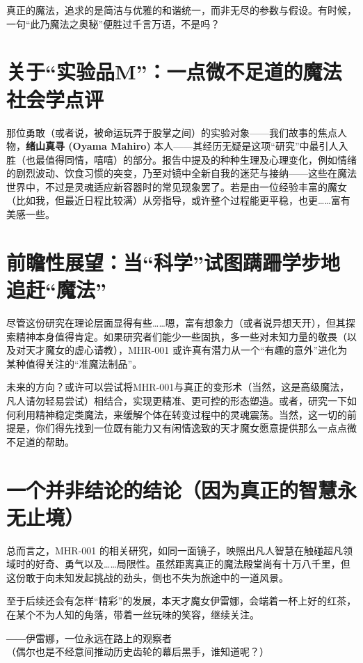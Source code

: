 \documentclass[lang=cn]{elegantpaper}
\begin{document}
真正的魔法，追求的是简洁与优雅的和谐统一，而非无尽的参数与假设。有时候，一句“此乃魔法之奥秘”便胜过千言万语，不是吗？

\section*{关于“实验品M”：一点微不足道的魔法社会学点评}
那位勇敢（或者说，被命运玩弄于股掌之间）的实验对象——我们故事的焦点人物，\textbf{绪山真寻 (Oyama Mahiro)} 本人——其经历无疑是这项“研究”中最引人入胜（也最值得同情，嘻嘻）的部分。报告中提及的种种生理及心理变化，例如情绪的剧烈波动、饮食习惯的突变，乃至对镜中全新自我的迷茫与接纳——这些在魔法世界中，不过是灵魂适应新容器时的常见现象罢了。若是由一位经验丰富的魔女（比如我，但最近日程比较满）从旁指导，或许整个过程能更平稳，也更……富有美感一些。

\section*{前瞻性展望：当“科学”试图蹒跚学步地追赶“魔法”}
尽管这份研究在理论层面显得有些……嗯，富有想象力（或者说异想天开），但其探索精神本身值得肯定。如果研究者们能少一些固执，多一些对未知力量的敬畏（以及对天才魔女的虚心请教），MHR-001 或许真有潜力从一个“有趣的意外”进化为某种值得关注的“准魔法制品”。

未来的方向？或许可以尝试将MHR-001与真正的变形术（当然，这是高级魔法，凡人请勿轻易尝试）相结合，实现更精准、更可控的形态塑造。或者，研究一下如何利用精神稳定类魔法，来缓解个体在转变过程中的灵魂震荡。当然，这一切的前提是，你们得先找到一位既有能力又有闲情逸致的天才魔女愿意提供那么一点点微不足道的帮助。

\section*{一个并非结论的结论（因为真正的智慧永无止境）}
总而言之，MHR-001 的相关研究，如同一面镜子，映照出凡人智慧在触碰超凡领域时的好奇、勇气以及……局限性。虽然距离真正的魔法殿堂尚有十万八千里，但这份敢于向未知发起挑战的劲头，倒也不失为旅途中的一道风景。

至于后续还会有怎样“精彩”的发展，本天才魔女伊雷娜，会端着一杯上好的红茶，在某个不为人知的角落，带着一丝玩味的笑容，继续关注。
\begin{flushright}
    ――伊雷娜，一位永远在路上的观察者\\
    （偶尔也是不经意间推动历史齿轮的幕后黑手，谁知道呢？）
\end{flushright}
\end{document}

